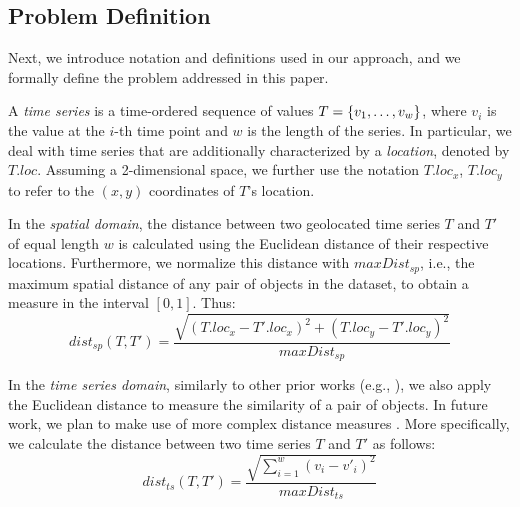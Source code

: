 \subsection{Problem Definition}
\label{sec:problem}

%
Next, we introduce notation and definitions used in our approach, and we formally define the problem addressed in this paper.


A {\em time series} is a time-ordered sequence of values $T = \{v_1, \ldots, \\v_w\}$, where $v_i$ is the value at the $i$-th time point and $w$ is the length of the series. In particular, we deal with time series that are additionally characterized by a \emph{location}, denoted by $T.loc$. Assuming a 2-dimensional space, we further use the notation $T.loc_x$, $T.loc_y$ to refer to the $(x,y)$ coordinates of $T$'s location. 

In the {\em spatial domain}, the distance between two geolocated time series $T$ and $T'$ of equal length $w$ is calculated using the Euclidean distance of their respective locations. Furthermore, we normalize this distance with $maxDist_{sp}$, i.e., the maximum spatial distance of any pair of objects in the dataset, to obtain a measure in the interval $[0,1]$. Thus:
\begin{equation} \label{eq:dist_sp}
dist_{sp}(T, T') = \frac{\sqrt{(T.loc_x - T'.loc_x)^2 + (T.loc_y - T'.loc_y)^2}}{maxDist_{sp}}
\end{equation} \label{eq:2}

In the {\em time series domain}, similarly to other prior works (e.g., \cite{shieh2008kdd}), we also apply the Euclidean distance to measure the similarity of a pair of objects. In future work, we plan to make use of more complex distance measures \cite{paparrizos2015k}. More specifically, we calculate the distance between two time series $T$ and $T'$ as follows:
\begin{equation} \label{eq:dist_ts}
dist_{ts}(T, T') = \frac{\sqrt{\displaystyle \sum_{i=1}^{w}(v_i - v'_i)^2}}{maxDist_{ts}}
\end{equation}

